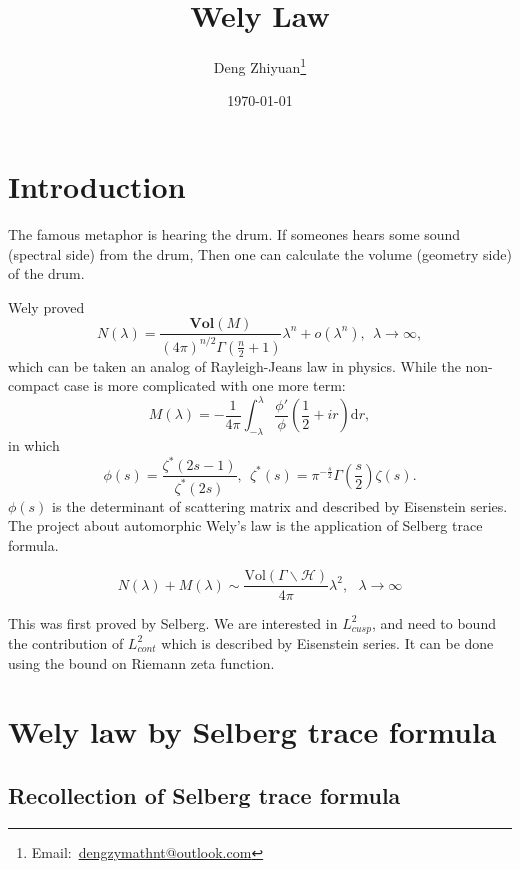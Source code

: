 \documentclass[12pt,a4paper,english]{article}
\title{Wely Law}
\date{\today}
\author{Deng Zhiyuan\footnote{Email:\ \href{mailto:dengzymathnt@outlook.com}{dengzymathnt@outlook.com}}}
\theoremstyle{plain}
\theoremstyle{definition}
\theoremstyle{remark}
\newcommand{\dif}{\text{d}}
\begin{document}
\maketitle
\newpage

\tableofcontents
\newpage

\section{Introduction}
The famous metaphor is hearing the drum. If someones hears some sound (spectral side) from the drum, Then one can calculate the volume (geometry side) of the drum.
    
    
    Wely proved
    \begin{equation*}
        N(\lambda)=\frac{\textbf{Vol}(M)}{(4\pi)^{n/2}\Gamma(\frac{n}{2}+1)}\lambda^{n}+o(\lambda^{n}), \ \ \lambda\rightarrow\infty,
    \end{equation*}
    which can be taken an analog of  Rayleigh-Jeans law in physics.
While the non-compact case is more complicated with one more term:
    \begin{equation*}
      M(\lambda)=-\frac{1}{4\pi}\int^{\lambda}_{-\lambda}\frac{\phi'}{\phi}(\frac{1}{2}+ir)\dif r,
    \end{equation*}
    in which 
    \begin{equation*}
      \phi(s)=\frac{\zeta^{*}(2s-1)}{\zeta^{*}(2s)},\ \ \zeta^{*}(s)=\pi^{-\frac{s}{2}}\Gamma(\frac{s}{2})\zeta(s).
    \end{equation*}
    $\phi(s)$ is the determinant of scattering matrix and described by Eisenstein series.
        The project about automorphic Wely's law is the application of Selberg trace formula. 
    
    \begin{equation*}
    N(\lambda)+M(\lambda) \sim \frac{\text{Vol}(\Gamma\backslash \mathcal{H})}{4\pi}\lambda^{2},\ \ \ \lambda\rightarrow\infty    
    \end{equation*}
    
    
    This was first proved by Selberg. We are interested in $L^{2}_{cusp}$, and need to bound the contribution of $L^{2}_{cont}$ which is described by Eisenstein series. It can be done using the bound on Riemann zeta function.
\section{Wely law by Selberg trace formula}
\subsection{Recollection of Selberg trace formula}
\end{document}
